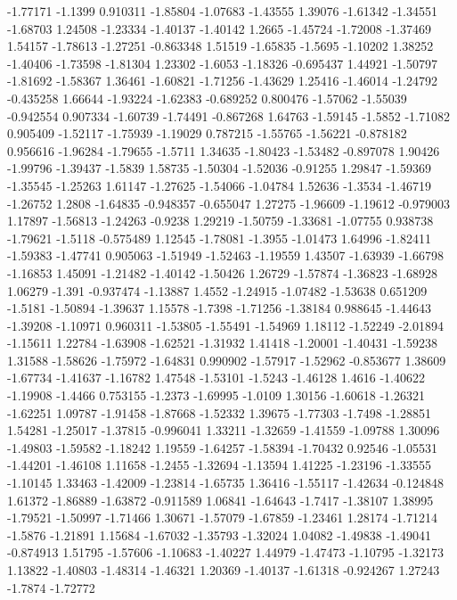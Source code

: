 \documentclass[9pt]{article}
\theoremstyle{plain}
\theoremstyle{definition}
\theoremstyle{remark}
\numberwithin{equation}{section}
\begin{document}
-1.77171
-1.1399
0.910311
-1.85804
-1.07683
-1.43555
1.39076
-1.61342
-1.34551
-1.68703
1.24508
-1.23334
-1.40137
-1.40142
1.2665
-1.45724
-1.72008
-1.37469
1.54157
-1.78613
-1.27251
-0.863348
1.51519
-1.65835
-1.5695
-1.10202
1.38252
-1.40406
-1.73598
-1.81304
1.23302
-1.6053
-1.18326
-0.695437
1.44921
-1.50797
-1.81692
-1.58367
1.36461
-1.60821
-1.71256
-1.43629
1.25416
-1.46014
-1.24792
-0.435258
1.66644
-1.93224
-1.62383
-0.689252
0.800476
-1.57062
-1.55039
-0.942554
0.907334
-1.60739
-1.74491
-0.867268
1.64763
-1.59145
-1.5852
-1.71082
0.905409
-1.52117
-1.75939
-1.19029
0.787215
-1.55765
-1.56221
-0.878182
0.956616
-1.96284
-1.79655
-1.5711
1.34635
-1.80423
-1.53482
-0.897078
1.90426
-1.99796
-1.39437
-1.5839
1.58735
-1.50304
-1.52036
-0.91255
1.29847
-1.59369
-1.35545
-1.25263
1.61147
-1.27625
-1.54066
-1.04784
1.52636
-1.3534
-1.46719
-1.26752
1.2808
-1.64835
-0.948357
-0.655047
1.27275
-1.96609
-1.19612
-0.979003
1.17897
-1.56813
-1.24263
-0.9238
1.29219
-1.50759
-1.33681
-1.07755
0.938738
-1.79621
-1.5118
-0.575489
1.12545
-1.78081
-1.3955
-1.01473
1.64996
-1.82411
-1.59383
-1.47741
0.905063
-1.51949
-1.52463
-1.19559
1.43507
-1.63939
-1.66798
-1.16853
1.45091
-1.21482
-1.40142
-1.50426
1.26729
-1.57874
-1.36823
-1.68928
1.06279
-1.391
-0.937474
-1.13887
1.4552
-1.24915
-1.07482
-1.53638
0.651209
-1.5181
-1.50894
-1.39637
1.15578
-1.7398
-1.71256
-1.38184
0.988645
-1.44643
-1.39208
-1.10971
0.960311
-1.53805
-1.55491
-1.54969
1.18112
-1.52249
-2.01894
-1.15611
1.22784
-1.63908
-1.62521
-1.31932
1.41418
-1.20001
-1.40431
-1.59238
1.31588
-1.58626
-1.75972
-1.64831
0.990902
-1.57917
-1.52962
-0.853677
1.38609
-1.67734
-1.41637
-1.16782
1.47548
-1.53101
-1.5243
-1.46128
1.4616
-1.40622
-1.19908
-1.4466
0.753155
-1.2373
-1.69995
-1.0109
1.30156
-1.60618
-1.26321
-1.62251
1.09787
-1.91458
-1.87668
-1.52332
1.39675
-1.77303
-1.7498
-1.28851
1.54281
-1.25017
-1.37815
-0.996041
1.33211
-1.32659
-1.41559
-1.09788
1.30096
-1.49803
-1.59582
-1.18242
1.19559
-1.64257
-1.58394
-1.70432
0.92546
-1.05531
-1.44201
-1.46108
1.11658
-1.2455
-1.32694
-1.13594
1.41225
-1.23196
-1.33555
-1.10145
1.33463
-1.42009
-1.23814
-1.65735
1.36416
-1.55117
-1.42634
-0.124848
1.61372
-1.86889
-1.63872
-0.911589
1.06841
-1.64643
-1.7417
-1.38107
1.38995
-1.79521
-1.50997
-1.71466
1.30671
-1.57079
-1.67859
-1.23461
1.28174
-1.71214
-1.5876
-1.21891
1.15684
-1.67032
-1.35793
-1.32024
1.04082
-1.49838
-1.49041
-0.874913
1.51795
-1.57606
-1.10683
-1.40227
1.44979
-1.47473
-1.10795
-1.32173
1.13822
-1.40803
-1.48314
-1.46321
1.20369
-1.40137
-1.61318
-0.924267
1.27243
-1.7874
-1.72772
\end{document}

